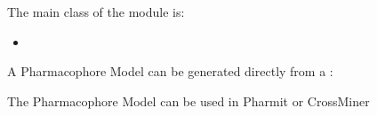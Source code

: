\documentclass[letterpaper,10pt,english]{sphinxmanual}
\begin{document}
The main class of the {\hyperref[\detokenize{hs_pharmacophore_api:module-hotspots.hs_pharmacophore}]{}} module is:
\begin{itemize}
\item {} 
{\hyperref[\detokenize{hs_pharmacophore_api:hotspots.hs_pharmacophore.PharmacophoreModel}]{}}

\end{itemize}

A Pharmacophore Model can be generated directly from a  :

\begin{sphinxVerbatim}[commandchars=\\\{\}]
   
\end{sphinxVerbatim}

\begin{sphinxVerbatim}[commandchars=\\\{\}]
  
  
\end{sphinxVerbatim}

The Pharmacophore Model can be used in Pharmit or CrossMiner
\end{document}
